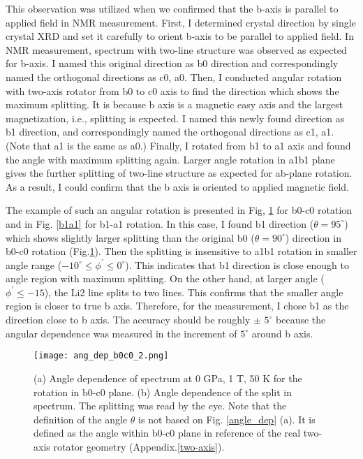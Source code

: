 This observation was utilized when we confirmed that the b-axis is parallel to applied field in NMR measurement.
First, I determined crystal direction by single crystal XRD and set it carefully to orient b-axis to be parallel to applied field.
In NMR measurement, spectrum with two-line structure was observed as expected for b-axis.
I named this original direction as b0 direction and correspondingly named the orthogonal directions as c0, a0.
Then, I conducted angular rotation with two-axis rotator from b0 to c0 axis to find the direction which shows the maximum splitting.
It is because b axis is a magnetic easy axis and the largest magnetization, i.e., splitting is expected.
I named this newly found direction as b1 direction, and correspondingly named the orthogonal directions as c1, a1.
(Note that a1 is the same as a0.)
Finally, I rotated from b1 to a1 axis and found the angle with maximum splitting again.
Larger angle rotation in a1b1 plane gives the further splitting of two-line structure as expected for ab-plane rotation.
As a result, I could confirm that the b axis is oriented to applied magnetic field.

The example of such an angular rotation is presented in Fig, \ref{b0c0} for b0-c0 rotation and in Fig. \ref{b1a1} for b1-a1 rotation.
In this case, I found b1 direction ($\theta = 95^\circ$) which shows slightly larger splitting than the original b0 ($\theta = 90^\circ$) direction in b0-c0 rotation (Fig.\ref{b0c0}).
Then the splitting is insensitive to a1b1 rotation in smaller angle range ($-10^\circ \leq \phi^\prime \leq 0^\circ$).
This indicates that b1 direction is close enough to angle region with maximum splitting.
On the other hand, at larger angle ($\phi^\prime \leq -15$), the Li2 line splits to two lines.
This confirms that the smaller angle region is closer to true b axis.
Therefore, for the measurement, I chose b1 as the direction close to b axis.
The accuracy should be roughly $\pm$ $5^\circ$ because the angular dependence was measured in the increment of $5^\circ$ around b axis.

\begin{figure}
  \centering
  \texttt{[image: ang\_dep\_b0c0\_2.png]}
  \caption{(a) Angle dependence of spectrum at 0 GPa, 1 T, 50 K for the rotation in b0-c0 plane.
  (b) Angle dependence of the split in spectrum. The splitting was read by the eye.
  Note that the definition of the angle $\theta$ is not based on Fig. \ref{angle_dep} (a).
  It is defined as the angle within b0-c0 plane in reference of the real two-axis rotator geometry (Appendix.\ref{two-axis}).}
  \label{b0c0}
\end{figure}

